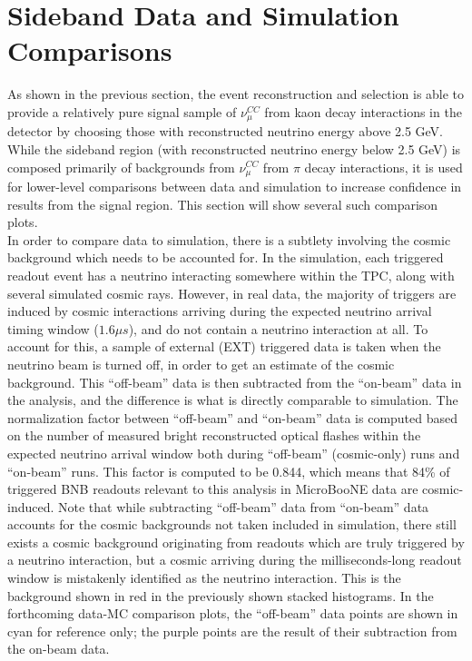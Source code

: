 \section{Sideband Data and Simulation Comparisons}\label{kaon_sideband_data_mc_comparisons_section}
As shown in the previous section, the event reconstruction and selection is able to provide a relatively pure signal sample of $\nu_\mu^{CC}$ from kaon decay interactions in the detector by choosing those with reconstructed neutrino energy above 2.5 GeV. While the sideband region (with reconstructed neutrino energy below 2.5 GeV) is composed primarily of backgrounds from $\nu_\mu^{CC}$ from $\pi$ decay interactions, it is used for lower-level comparisons between data and simulation to increase confidence in results from the signal region. This section will show several such comparison plots.\\

In order to compare data to simulation, there is a subtlety involving the cosmic background which needs to be accounted for. In the simulation, each triggered readout event has a neutrino interacting somewhere within the TPC, along with several simulated cosmic rays. However, in real data, the majority of triggers are induced by cosmic interactions arriving during the expected neutrino arrival timing window ($1.6\mu s$), and do not contain a neutrino interaction at all. To account for this, a sample of external (EXT) triggered data is taken when the neutrino beam is turned off, in order to get an estimate of the cosmic background. This ``off-beam'' data is then subtracted from the ``on-beam'' data in the analysis, and the difference is what is directly comparable to simulation. The normalization factor between ``off-beam'' and ``on-beam'' data is computed based on the number of measured bright reconstructed optical flashes within the expected neutrino arrival window both during ``off-beam'' (cosmic-only) runs and ``on-beam'' runs. This factor is computed to be 0.844, which means that 84\% of triggered BNB readouts relevant to this analysis in MicroBooNE data are cosmic-induced. Note that while subtracting ``off-beam'' data from ``on-beam'' data accounts for the cosmic backgrounds not taken included in simulation, there still exists a cosmic background originating from readouts which are truly triggered by a neutrino interaction, but a cosmic arriving during the milliseconds-long readout window is mistakenly identified as the neutrino interaction. This is the background shown in red in the previously shown stacked histograms. In the forthcoming data-MC comparison plots, the ``off-beam'' data points are shown in cyan for reference only; the purple points are the result of their subtraction from the on-beam data.\\

